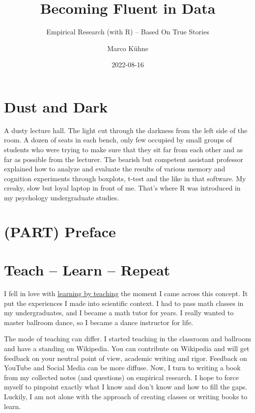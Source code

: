 \documentclass[
]{book}
\title{Becoming Fluent in Data}
\subtitle{Empirical Research (with R) -- Based On True Stories}
\author{Marco Kühne}
\date{2022-08-16}
\begin{document}
\maketitle

{
\setcounter{tocdepth}{1}
\tableofcontents
}
\hypertarget{dust-and-dark}{%
\chapter*{Dust and Dark}\label{dust-and-dark}}

A dusty lecture hall. The light cut through the darkness from the left side of the room. A dozen of seats in each bench, only few occupied by small groups of students who were trying to make sure that they sit far from each other and as far as possible from the lecturer. The bearish but competent assistant professor explained how to analyze and evaluate the results of various memory and cognition experiments through boxplots, t-test and the like in that software. My creaky, slow but loyal laptop in front of me. That's where R was introduced in my psychology undergraduate studies.

\hypertarget{part-preface}{%
\chapter*{(PART) Preface}\label{part-preface}}

\hypertarget{teach-learn-repeat}{%
\chapter{Teach -- Learn -- Repeat}\label{teach-learn-repeat}}

I fell in love with \href{https://en.wikipedia.org/wiki/Learning_by_teaching}{learning by teaching} the moment I came across this concept. It put the experiences I made into scientific context. I had to pass math classes in my undergraduates, and I became a math tutor for years. I really wanted to master ballroom dance, so I became a dance instructor for life.

The mode of teaching can differ. I started teaching in the classroom and ballroom and have a standing on Wikipedia. You can contribute on Wikipedia and will get feedback on your neutral point of view, academic writing and rigor. Feedback on YouTube and Social Media can be more diffuse. Now, I turn to writing a book from my collected notes (and questions) on empirical research. I hope to force myself to pinpoint exactly what I know and don't know and how to fill the gaps. Luckily, I am not alone with the approach of creating classes or writing books to learn.
\end{document}
